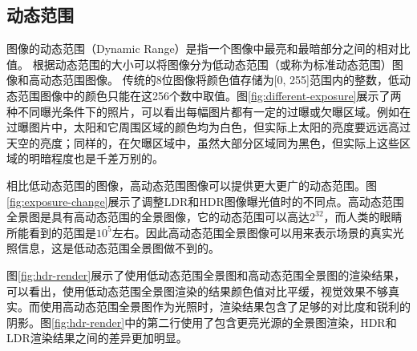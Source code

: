 \subsection{动态范围}

图像的动态范围（Dynamic Range）是指一个图像中最亮和最暗部分之间的相对比值\cite{wikipedia}。
根据动态范围的大小可以将图像分为低动态范围（或称为标准动态范围）图像和高动态范围图像。
传统的8位图像将颜色值存储为[0, 255]范围内的整数，低动态范围图像中的颜色只能在这256个数中取值。图\ref{fig:different-exposure}展示了两种不同曝光条件下的照片，可以看出每幅图片都有一定的过曝或欠曝区域。例如在过曝图片中，太阳和它周围区域的颜色均为白色，但实际上太阳的亮度要远远高过天空的亮度；同样的，在欠曝区域中，虽然大部分区域同为黑色，但实际上这些区域的明暗程度也是千差万别的。


相比低动态范围的图像，高动态范围图像可以提供更大更广的动态范围。图\ref{fig:exposure-change}展示了调整LDR和HDR图像曝光值时的不同点。高动态范围全景图是具有高动态范围的全景图像，它的动态范围可以高达$2^{32}$，而人类的眼睛所能看到的范围是$10^5$左右\cite{wikipedia}。因此高动态范围全景图像可以用来表示场景的真实光照信息，这是低动态范围全景图做不到的。


图\ref{fig:hdr-render}展示了使用低动态范围全景图和高动态范围全景图的渲染结果，可以看出，使用低动态范围全景图渲染的结果颜色值对比平缓，视觉效果不够真实。而使用高动态范围全景图作为光照时，渲染结果包含了足够的对比度和锐利的阴影。图\ref{fig:hdr-render}中的第二行使用了包含更亮光源的全景图渲染，HDR和LDR渲染结果之间的差异更加明显。

